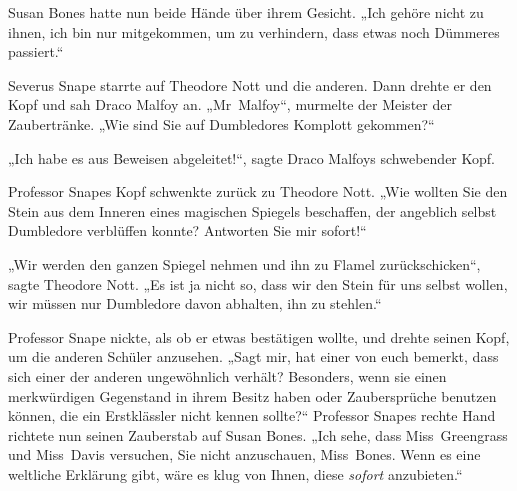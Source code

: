 Susan Bones hatte nun beide Hände über ihrem Gesicht.
„Ich gehöre nicht zu ihnen, ich bin nur mitgekommen, um zu verhindern, dass etwas noch Dümmeres passiert.“

Severus Snape starrte auf Theodore Nott und die anderen. Dann drehte er den Kopf und sah Draco Malfoy an.
„Mr~Malfoy“, murmelte der Meister der Zaubertränke.
„Wie sind Sie auf Dumbledores Komplott gekommen?“

„Ich habe es aus Beweisen abgeleitet!“, sagte Draco Malfoys schwebender Kopf.

Professor Snapes Kopf schwenkte zurück zu Theodore Nott.
„Wie wollten Sie den Stein aus dem Inneren eines magischen Spiegels beschaffen, der angeblich selbst Dumbledore verblüffen konnte? Antworten Sie mir sofort!“

„Wir werden den ganzen Spiegel nehmen und ihn zu Flamel zurückschicken“, sagte Theodore Nott.
„Es ist ja nicht so, dass wir den Stein für uns selbst wollen, wir müssen nur Dumbledore davon abhalten, ihn zu stehlen.“

Professor Snape nickte, als ob er etwas bestätigen wollte, und drehte seinen Kopf, um die anderen Schüler anzusehen.
„Sagt mir, hat einer von euch bemerkt, dass sich einer der anderen ungewöhnlich verhält? Besonders, wenn sie einen merkwürdigen Gegenstand in ihrem Besitz haben oder Zaubersprüche benutzen können, die ein Erstklässler nicht kennen sollte?“
Professor Snapes rechte Hand richtete nun seinen Zauberstab auf Susan Bones.
„Ich sehe, dass Miss~Greengrass und Miss~Davis versuchen, Sie nicht anzuschauen, Miss~Bones. Wenn es eine weltliche Erklärung gibt, wäre es klug von Ihnen, diese \emph{sofort} anzubieten.“

